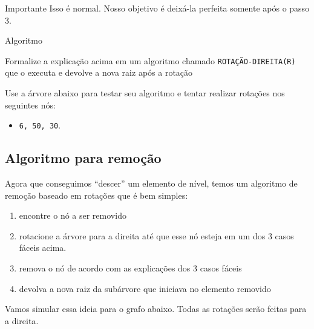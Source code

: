 \documentclass[]{article}
\providecommand{\tightlist}{%
  \setlength{\itemsep}{0pt}\setlength{\parskip}{0pt}}
\begin{document}
\begin{adjustwidth}{0pt}{10em}
\begin{boxYellow}{Importante}
Isso é normal. Nosso objetivo é deixá-la perfeita somente após o passo
3.

\end{boxYellow}

\begin{boxGreen}{Algoritmo}

Formalize a explicação acima em um algoritmo chamado
\texttt{ROTAÇÃO-DIREITA(R)} que o executa e devolve a nova raiz após a
rotação

\vspace{15em}

\end{boxGreen}

Use a árvore abaixo para testar seu algoritmo e tentar realizar rotações
nos seguintes nós:

\begin{itemize}
\tightlist
\item
  \texttt{6,\ 50,\ 30}.
\end{itemize}

\hfill{}

\pagebreak

\subsection{Algoritmo para remoção}\label{algoritmo-para-remouxe7uxe3o}

Agora que conseguimos ``descer'' um elemento de nível, temos um
algoritmo de remoção baseado em rotações que é bem simples:

\begin{enumerate}
\def\labelenumi{\arabic{enumi}.}
\tightlist
\item
  encontre o nó a ser removido
\item
  rotacione a árvore para a direita até que esse nó esteja em um dos 3
  casos fáceis acima.
\item
  remova o nó de acordo com as explicações dos 3 casos fáceis
\item
  devolva a nova raiz da subárvore que iniciava no elemento removido
\end{enumerate}

Vamos simular essa ideia para o grafo abaixo. Todas as rotações serão
feitas para a direita.

\hfill\break{\centering

}
\end{adjustwidth}
\end{document}
